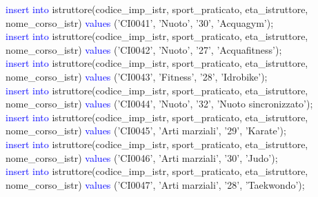 \documentclass{article}
\begin{document}
\begin{flushleft}
{        \hspace*{0.5em}\textcolor{blue}{insert into} istruttore(codice\_imp\_istr, sport\_praticato, eta\_istruttore, \hspace*{0.5em}nome\_corso\_istr) \textcolor{blue}{values} ('CI0041', 'Nuoto', '30', 'Acquagym'); \\
        \vspace{2mm}
        \hspace*{0.5em}\textcolor{blue}{insert into} istruttore(codice\_imp\_istr, sport\_praticato, eta\_istruttore, \hspace*{0.5em}nome\_corso\_istr) \textcolor{blue}{values} ('CI0042', 'Nuoto', '27', 'Acquafitness'); \\
        \vspace{2mm}
        \hspace*{0.5em}\textcolor{blue}{insert into} istruttore(codice\_imp\_istr, sport\_praticato, eta\_istruttore, \hspace*{0.5em}nome\_corso\_istr) \textcolor{blue}{values} ('CI0043', 'Fitness', '28', 'Idrobike'); \\
        \vspace{2mm}
        \hspace*{0.5em}\textcolor{blue}{insert into} istruttore(codice\_imp\_istr, sport\_praticato, eta\_istruttore, \hspace*{0.5em}nome\_corso\_istr) \textcolor{blue}{values} ('CI0044', 'Nuoto', '32', 'Nuoto sincronizzato'); \\
        \vspace{2mm}
        \hspace*{0.5em}\textcolor{blue}{insert into} istruttore(codice\_imp\_istr, sport\_praticato, eta\_istruttore, \hspace*{0.5em}nome\_corso\_istr) \textcolor{blue}{values} ('CI0045', 'Arti marziali', '29', 'Karate'); \\
        \vspace{2mm}
        \hspace*{0.5em}\textcolor{blue}{insert into} istruttore(codice\_imp\_istr, sport\_praticato, eta\_istruttore, \hspace*{0.5em}nome\_corso\_istr) \textcolor{blue}{values} ('CI0046', 'Arti marziali', '30', 'Judo'); \\
        \vspace{2mm}
        \hspace*{0.5em}\textcolor{blue}{insert into} istruttore(codice\_imp\_istr, sport\_praticato, eta\_istruttore, \hspace*{0.5em}nome\_corso\_istr) \textcolor{blue}{values} ('CI0047', 'Arti marziali', '28', 'Taekwondo'); \\
}
\end{flushleft}
\end{document}
